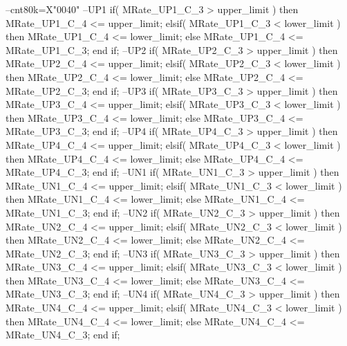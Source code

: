 \begin{mylisting}[language=VHDL,caption=ゲート信号出力モジュール,label=MMC_PWM_GEN_module_VHDL]
		--cnt80k=X"0040"
		--UP1
			if( MRate_UP1_C_3 > upper_limit ) then
				MRate_UP1_C_4 <= upper_limit;
			elsif( MRate_UP1_C_3	< lower_limit ) then
				MRate_UP1_C_4 <= lower_limit;
			else
				MRate_UP1_C_4 <= MRate_UP1_C_3;
			end if;
		--UP2
			if( MRate_UP2_C_3 > upper_limit ) then
				MRate_UP2_C_4 <= upper_limit;
			elsif( MRate_UP2_C_3	< lower_limit ) then
				MRate_UP2_C_4 <= lower_limit;
			else
				MRate_UP2_C_4 <= MRate_UP2_C_3;
			end if;
		--UP3
			if( MRate_UP3_C_3 > upper_limit ) then
				MRate_UP3_C_4 <= upper_limit;
			elsif( MRate_UP3_C_3	< lower_limit ) then
				MRate_UP3_C_4 <= lower_limit;
			else
				MRate_UP3_C_4 <= MRate_UP3_C_3;
			end if;
		--UP4
			if( MRate_UP4_C_3 > upper_limit ) then
				MRate_UP4_C_4 <= upper_limit;
			elsif( MRate_UP4_C_3	< lower_limit ) then
				MRate_UP4_C_4 <= lower_limit;
			else
				MRate_UP4_C_4 <= MRate_UP4_C_3;
			end if;
		--UN1
			if( MRate_UN1_C_3 > upper_limit ) then
				MRate_UN1_C_4 <= upper_limit;
			elsif( MRate_UN1_C_3	< lower_limit ) then
				MRate_UN1_C_4 <= lower_limit;
			else
				MRate_UN1_C_4 <= MRate_UN1_C_3;
			end if;
		--UN2
			if( MRate_UN2_C_3 > upper_limit ) then
				MRate_UN2_C_4 <= upper_limit;
			elsif( MRate_UN2_C_3	< lower_limit ) then
				MRate_UN2_C_4 <= lower_limit;
			else
				MRate_UN2_C_4 <= MRate_UN2_C_3;
			end if;
		--UN3
			if( MRate_UN3_C_3 > upper_limit ) then
				MRate_UN3_C_4 <= upper_limit;
			elsif( MRate_UN3_C_3	< lower_limit ) then
				MRate_UN3_C_4 <= lower_limit;
			else
				MRate_UN3_C_4 <= MRate_UN3_C_3;
			end if;
		--UN4
			if( MRate_UN4_C_3 > upper_limit ) then
				MRate_UN4_C_4 <= upper_limit;
			elsif( MRate_UN4_C_3	< lower_limit ) then
				MRate_UN4_C_4 <= lower_limit;
			else
				MRate_UN4_C_4 <= MRate_UN4_C_3;
			end if;


\end{mylisting}
